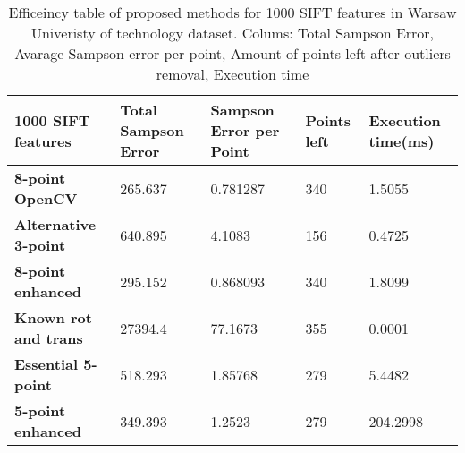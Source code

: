 \begin{table}[h]
\centering
\begin{adjustbox}{width=1\linewidth}
\begin{tabular}{l|l|l|l|l}
\textbf{1000 SIFT features}  & \textbf{Total Sampson Error} & \textbf{Sampson Error per Point} & \textbf{Points left} & \textbf{Execution time(ms)} \\ \hline
\textbf{8-point OpenCV}      & 265.637             & 0.781287                & 340         & 1.5055             \\ \hline
\textbf{Alternative 3-point} & 640.895             & 4.1083                  & 156         & 0.4725             \\ \hline
\textbf{8-point enhanced}    & 295.152             & 0.868093                & 340         & 1.8099             \\ \hline
\textbf{Known rot and trans} & 27394.4             & 77.1673                 & 355         & 0.0001             \\ \hline
\textbf{Essential 5-point}   & 518.293             & 1.85768                 & 279         & 5.4482             \\ \hline
\textbf{5-point enhanced}    & 349.393             & 1.2523                  & 279         & 204.2998           \\
\end{tabular}
\end{adjustbox}
\caption{Efficeincy table of proposed methods for 1000 SIFT features in Warsaw Univeristy of technology dataset. Colums: Total Sampson Error, Avarage Sampson error per point, Amount of points left after outliers removal, Execution time}
\label{table:Efficiency1000Sift}
\end{table}

